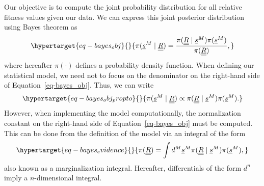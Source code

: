 \documentclass[
]{scrartcl}
\begin{document}
\begin{refsegment}
Our objective is to compute the joint probability distribution for all
relative fitness values given our data. We can express this joint
posterior distribution using Bayes theorem as
\begin{equation}\protect\hypertarget{eq-bayes_obj}{}{
\pi(\underline{s}^M \mid \underline{\underline{R}}) = \frac{
\pi(\underline{\underline{R}} \mid \underline{s}^M) 
\pi(\underline{s}^M)}
{\pi(\underline{\underline{R}})},
}\label{eq-bayes_obj}\end{equation} where hereafter \(\pi(\cdot)\)
defines a probability density function. When defining our statistical
model, we need not to focus on the denominator on the right-hand side of
Equation~\ref{eq-bayes_obj}. Thus, we can write
\begin{equation}\protect\hypertarget{eq-bayes_obj_propto}{}{
\pi(\underline{s}^M \mid \underline{\underline{R}}) \propto
\pi(\underline{\underline{R}} \mid \underline{s}^M) 
\pi(\underline{s}^M).
}\label{eq-bayes_obj_propto}\end{equation} However, when implementing
the model computationally, the normalization constant on the right-hand
side of Equation~\ref{eq-bayes_obj} must be computed. This can be done
from the definition of the model via an integral of the form
\begin{equation}\protect\hypertarget{eq-bayes_evidence}{}{
\pi(\underline{\underline{R}}) = \int d^M \underline{s}^M
\pi(\underline{\underline{R}} \mid \underline{s}^M) 
\pi(\underline{s}^M),
}\label{eq-bayes_evidence}\end{equation} also known as a marginalization
integral. Hereafter, differentials of the form \(d^n\) imply a
\(n\)-dimensional integral.


\end{refsegment}
\end{document}
